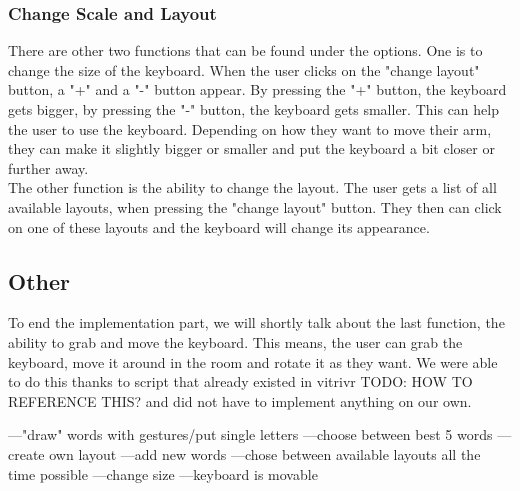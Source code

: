 \subsubsection{Change Scale and Layout}
There are other two functions that can be found under the options. One is to change the size of the keyboard. When the user clicks on the "change layout" button, a "+" and a "-" button appear. By pressing the "+" button, the keyboard gets bigger, by pressing the "-" button, the keyboard gets smaller. This can help the user to use the keyboard. Depending on how they want to move their arm, they can make it slightly bigger or smaller and put the keyboard a bit closer or further away.\\
The other function is the ability to change the layout. The user gets a list of all available layouts, when pressing the "change layout" button. They then can click on one of these layouts and the keyboard will change its appearance.

\subsection{Other}
To end the implementation part, we will shortly talk about the last function, the ability to grab and move the keyboard. This means, the user can grab the keyboard, move it around in the room and rotate it as they want. We were able to do this thanks to script that already existed in vitrivr TODO: HOW TO REFERENCE THIS? and did not have to implement anything on our own.



---"draw" words with gestures/put single letters
---choose between best 5 words
---create own layout
---add new words
---chose between available layouts all the time possible
---change size
---keyboard is movable
